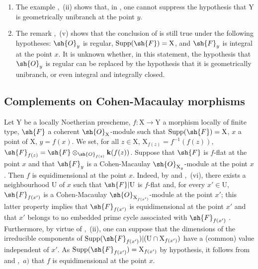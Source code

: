 \begin{remarks}[15.3.4]
\label{IV.15.3.4}
\begin{enumerate}[label=(\roman*)]
  \item The example ,~(ii) shows that, in , one cannot suppress the hypothesis that $\mathrm{Y}$ is geometrically unibranch at the point $y$.
  \item The remark ,~(v) shows that the conclusion of  is still true under the following hypotheses: $\sh{O}_y$ is regular, $\operatorname{Supp}(\sh{F})=\mathrm{X}$, and $\sh{F}_y$ is integral at the point $x$.
It is unknown whether, in this statement, the hypothesis that $\sh{O}_y$ is regular can be replaced by the hypothesis that it is geometrically unibranch, or even integral and integrally closed.
\end{enumerate}
\end{remarks}

\subsection{Complements on Cohen-Macaulay morphisms}
\label{subsection:IV.15.4}

\begin{proposition}[15.4.1]
\label{IV.15.4.1}
Let $\mathrm{Y}$ be a locally Noetherian prescheme, $f:\mathrm{X}\to\mathrm{Y}$ a morphism locally of finite type, $\sh{F}$ a coherent $\sh{O}_\mathrm{X}$-module such that $\operatorname{Supp}(\sh{F})=\mathrm{X}$, $x$ a point of $\mathrm{X}$, $y=f(x)$.
We set, for all $z\in\mathrm{X}$, $\mathrm{X}_{f(z)}=f^{-1}(f(z))$, $\sh{F}_{f(z)}=\sh{F}\otimes_{\sh{O}_{f(z)}}\mathbf{k}(f(z))$.
Suppose that $\sh{F}$ is $f$-flat at the point $x$ and that $\sh{F}_y$ is a Cohen-Macaulay $\sh{O}_{\mathrm{X}_y}$-module at the point $x$.
Then $f$ is
equidimensional at the point $x$.
Indeed, by  and ,~(vi), there exists a neighbourhood $\mathrm{U}$ of $x$ such that $\sh{F}|\mathrm{U}$ is $f$-flat and, for every $x'\in\mathrm{U}$, $\sh{F}_{f(x')}$ is a Cohen-Macaulay $\sh{O}_{\mathrm{X}_{f(x')}}$-module at the point $x'$; this latter property implies that $\sh{F}_{f(x')}$ is equidimensional at the point $x'$ and that $x'$ belongs to no embedded prime cycle associated with $\sh{F}_{f(x')}$ .
Furthermore, by virtue of ,~(ii), one can suppose that the dimensions of the irreducible components of $\operatorname{Supp}(\sh{F}_{f(x')})|(\mathrm{U}\cap\mathrm{X}_{f(x')})$ have a (common) value independent of $x'$.
As $\operatorname{Supp}(\sh{F}_{f(x')})=\mathrm{X}_{f(x')}$ by hypothesis, it follows from  and ,~$a)$ that $f$ is equidimensional at the point $x$.
\end{proposition}

